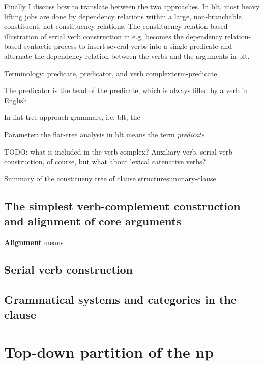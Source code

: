 \documentclass{article}
\newcommand*{\concept}[1]{\textbf{#1}}
\newcommand*{\term}[1]{\emph{#1}}
\begin{document}
Finally I discuss how to translate between the two approaches.
In \ac{blt}, most heavy lifting jobs are done by dependency relations within a large, non-branchable constituent, 
not constituency relations.
The constituency relation-based illustration of serial verb construction in e.g. \citet{chen2016mandarin}
becomes the dependency relation-based syntactic process to insert several verbs into a single predicate 
and alternate the dependency relation between the verbs and the arguments in \ac{blt}.

\begin{infobox}{Terminology: predicate, predicator, and verb complex}{term-predicate}
    
    The predicator is the head of the predicate, which is always filled by a verb in English.

    In flat-tree approach grammars, i.e. \ac{blt}, 
    the 
\end{infobox}

Parameter: the flat-tree analysis in \ac{blt} means the term \term{predicate} 

TODO: what is included in the verb complex? Auxiliary verb, serial verb construction, of course,
but what about lexical catenative verbs?

\begin{infobox}{Summary of the constitueny tree of clause structure}{summary-clause}
    
\end{infobox}

\subsection{The simplest verb-complement construction and alignment of core arguments}

\concept{Alignment} means 

\subsection{Serial verb construction}\label{sec:serial-verb-construction}

\subsection{Grammatical systems and categories in the clause}

\section{Top-down partition of the \acl{np}}
\end{document}
